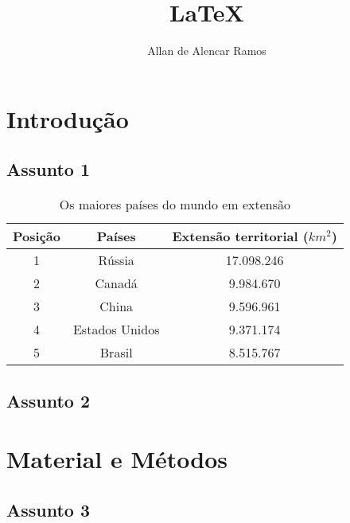 \documentclass[12pt, a4paper, oneside]{book}
\begin{document}
\title{LaTeX}
\author{Allan de Alencar Ramos}
\maketitle

\tableofcontents

\listoffigures

\listoftables

\newpage

\chapter{Introdução}

\section{Assunto 1}

\begin{table}[h]\label{TabMaioresPaisesEmExtensao}
\centering
\caption{Os maiores países do mundo em extensão}
\vspace{0.5cm}
\begin{tabular}{ c | cc |}
	Posição & Países & Extensão territorial ($km^{2}$) \\ \hline
	1 & Rússia 			& 17.098.246 \\
	2 & Canadá 			& 9.984.670 \\
	3 & China 			& 9.596.961 \\
	4 & Estados Unidos 	& 9.371.174 \\
	5 & Brasil 			& 8.515.767 \\

\end{tabular}

\end{table}

\section{Assunto 2}

\chapter{Material e Métodos}

\section{Assunto 3}
\end{document}
